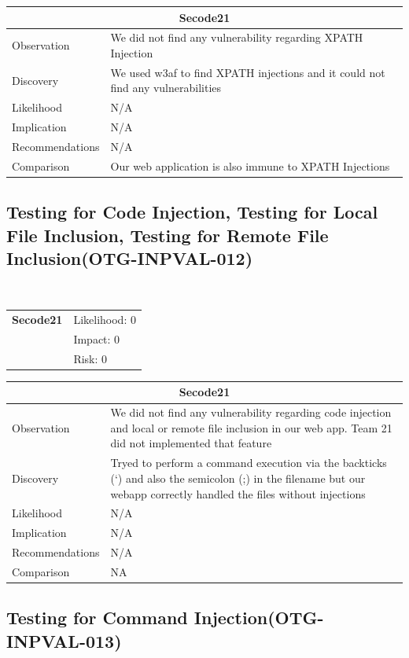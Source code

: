 \documentclass[headsepline,footsepline,footinclude=false,oneside,fontsize=11pt,paper=a4,listof=totoc,bibliography=totoc]{scrbook} %
\begin{document}
\begin{tabular}{ l|p{11cm}  }
	\hline
	\multicolumn{2}{c}{\textbf{Secode21}} \\
	\hline
	Observation   & We did not find any vulnerability regarding XPATH Injection\\
	Discovery  & We used w3af to find XPATH injections and it could not find any vulnerabilities \\
	Likelihood & N/A \\
	Implication    & N/A \\
	Recommendations & N/A \\
	Comparison& Our web application is also immune to XPATH Injections \\
	\hline
\end{tabular}

\pagebreak
\subsection{Testing for Code Injection, Testing for Local File Inclusion, Testing for Remote File Inclusion(OTG-INPVAL-012)}\

\begin{tabular}{cR{12cm}}
	\textbf{Secode21} & Likelihood: 0\\& Impact: 0\\& Risk: 0
\end{tabular}

\begin{tabular}{ l|p{11cm}  }
	\hline
	\multicolumn{2}{c}{\textbf{Secode21}} \\
	\hline
	Observation   & We did not find any vulnerability regarding code injection and local or remote file inclusion in our
	web app. Team 21 did not implemented that feature\\
	Discovery  & Tryed to perform a command execution via the backticks (`) and also the semicolon (;) in the filename but our
	webapp correctly handled the files without injections \\
	Likelihood & N/A \\
	Implication    & N/A \\
	Recommendations & N/A \\
	Comparison& NA \\
	\hline
\end{tabular}

\pagebreak
\subsection{Testing for Command Injection(OTG-INPVAL-013)}\
\end{document}
